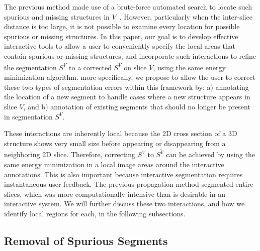 \documentclass[]{spie}  %
\begin{document}
The previous method made use of a brute-force automated search to
locate such spurious and missing structures in $V$~\cite{waggoner:11}.
However, particularly when the inter-slice distance is too large, it
is not possible to examine every location for possible spurious or
missing structures.  In this paper, our goal is to develop effective
interactive tools to allow a user to conveniently specify the local
areas that contain spurious or missing structures, and incorporate
such interactions to refine the segmentation $S^V$ to a corrected
$S^{\tilde{V}}$ on slice $V$, using the same energy minimization
algorithm.  more specifically, we propose to allow the user to correct
these two types of segmentation errors within this framework by: a)
annotating the location of a new segment to handle cases where a new
structure appears in slice $V$, and b) annotation of existing segments
that should no longer be present in segmentation $S^V$.

These interactions are inherently local because the 2D cross section
of a 3D structure shows very small size before appearing or
disappearing from a neighboring 2D slice.  Therefore, correcting $S^V$
to $S^{\tilde{V}}$ can be achieved by using the same energy
minimization in a local image areas around the interactive
annotations.  This is also important because interactive segmentation
requires instantaneous user feedback.  The previous propagation method
segmented entire slices, which was more computationally intensive than
is desirable in an interactive system.  We will further discuss these
two interactions, and how we identify local regions for each, in the
following subsections.

\subsection{Removal of Spurious Segments}
\label{sec:remove}
\end{document}

